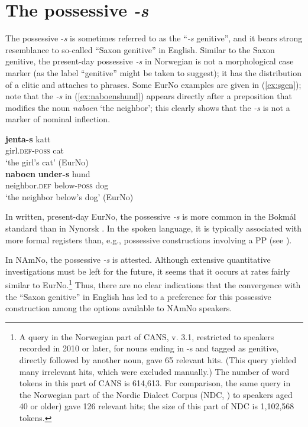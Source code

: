 \documentclass[output=paper,colorlinks,citecolor=brown]{langscibook}
\begin{document}
\section{The possessive \emph{-s}}\label{sec:s-gen}
The possessive -\emph{s} is sometimes referred to as the ``\emph{-s} genitive'', and it bears strong resemblance to so-called ``Saxon genitive'' in English. Similar to the Saxon genitive, the present-day possessive \emph{-s} in Norwegian is not a morphological case marker (as the label ``genitive'' might be taken to suggest); it has the distribution of a clitic and attaches to phrases. Some EurNo examples are given in (\ref{ex:sgen}); note that the \emph{-s} in (\ref{ex:naboenshund}) appears directly after a preposition that modifies the noun \emph{naboen} `the neighbor'; this clearly shows that the \emph{-s} is not a marker of nominal inflection. 

\ea \label{ex:sgen} 
\ea \label{ex:jentaskatt} \gll \textbf{jenta-s} katt \\
girl.\textsc{def}-\textsc{poss} cat\\
\glt `the girl's cat' (EurNo) \\
\ex \label{ex:naboenshund} \gll \textbf{naboen} \textbf{under-s} hund \\
neighbor.\textsc{def} below-\textsc{poss} dog \\
\glt `the neighbor below's dog' (EurNo) \\
\z 
\z 


\noindent In written, present-day EurNo, the possessive \emph{-s} is more common in the Bokmål standard than in Nynorsk \citep[259]{faarlundetal1997nrg}. In the spoken language, it is typically associated with more formal registers than, e.g., possessive constructions involving a PP (see ). 

In NAmNo, the possessive \emph{-s} is  attested. Although extensive quantitative investigations must be left for the future, it seems that  it occurs at rates fairly similar to EurNo.\footnote{A query in the Norwegian part of CANS, v. 3.1, restricted to speakers  recorded in 2010 or later, for nouns ending in -s and tagged as genitive, directly followed by another noun, gave 65 relevant hits. (This query yielded many irrelevant hits, which were excluded manually.) The number of word tokens in this part of CANS is 614,613. For comparison, the same query in the Norwegian part of the Nordic Dialect Corpus (NDC, \citealt{Johannessen2009}) to speakers aged 40 or older) gave 126 relevant hits; the size of this part of NDC is 1,102,568 tokens.} Thus, there are no clear indications that the convergence with the ``Saxon genitive'' in English has led to a preference for this possessive construction among the options available to NAmNo speakers.  
\end{document}
